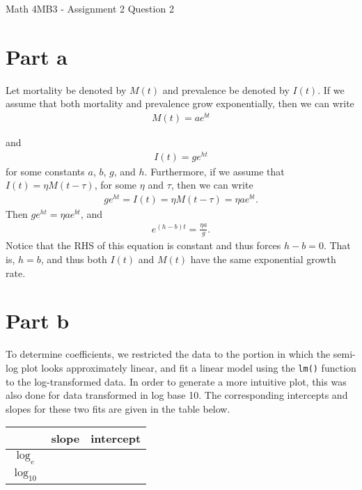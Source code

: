\documentclass{article}
\begin{document}
Math 4MB3 - Assignment 2 Question 2
\section*{Part a}
Let mortality be denoted by $M(t)$ and prevalence be denoted by $I(t)$. If we assume that both mortality and prevalence grow exponentially, then we can write
\begin{equation*}
\begin{aligned}
M(t) = a e^{bt}
\end{aligned}
\end{equation*}

and
\begin{equation*}
\begin{aligned}
I(t) = g e^{ht}
\end{aligned}
\end{equation*}
for some constants $a$, $b$, $g$, and $h$. Furthermore, if we assume that $I(t) = \eta M(t - \tau)$, for some $\eta$ and $\tau$, then we can write
\begin{equation*}
\begin{aligned}
g e^{ht} = I(t) = \eta M(t - \tau) = \eta a e^{bt}.
\end{aligned}
\end{equation*}
Then $g e^{ht} = \eta a e ^{bt}$, and
\begin{equation*}
\begin{aligned}
e^{(h-b)t} = \frac{\eta a }{g}.
\end{aligned}
\end{equation*}
Notice that the RHS of this equation is constant and thus forces $h - b = 0$. That is, $h=b$, and thus both $I(t)$ and $M(t)$ have the same exponential growth rate.

\section*{Part b}
To determine coefficients, we restricted the data to the portion in which the semi-log plot looks approximately linear, and fit a linear model using the \texttt{lm()} function to the log-transformed data. In order to generate a more intuitive plot, this was also done for data transformed in log base 10. The corresponding intercepts and slopes for these two fits are given in the table below.
\begin{center}
\begin{tabular}{c c c}\\
			& slope & intercept \\
 \hline
$\log_e$ 	& 		& \\
$\log_{10}$ &		&
\end{tabular}
\end{center}
\end{document}
